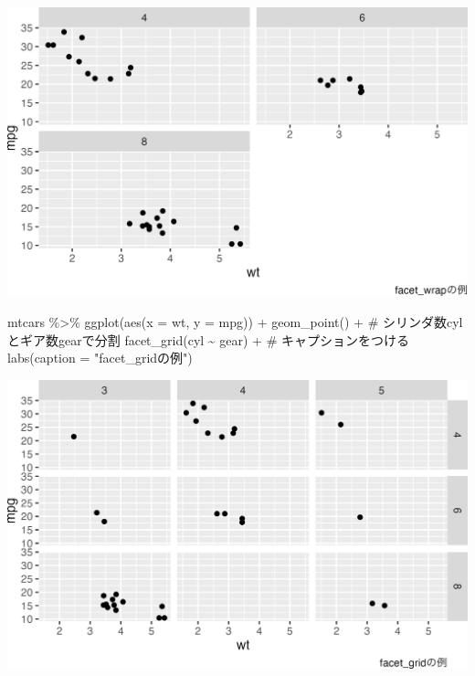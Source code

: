 \documentclass[
  a4paper,
]{ltjsbook}
\newenvironment{Shaded}{\begin{snugshade}}{\end{snugshade}}
\newcommand{\AttributeTok}[1]{\textcolor[rgb]{0.40,0.45,0.13}{#1}}
\newcommand{\CommentTok}[1]{\textcolor[rgb]{0.37,0.37,0.37}{#1}}
\newcommand{\FunctionTok}[1]{\textcolor[rgb]{0.28,0.35,0.67}{#1}}
\newcommand{\NormalTok}[1]{\textcolor[rgb]{0.00,0.23,0.31}{#1}}
\newcommand{\SpecialCharTok}[1]{\textcolor[rgb]{0.37,0.37,0.37}{#1}}
\newcommand{\StringTok}[1]{\textcolor[rgb]{0.13,0.47,0.30}{#1}}
\begin{document}
\includegraphics{chapter04_files/figure-pdf/exampleFacetWrap-1.png}

\begin{Shaded}
\begin{Highlighting}[]
\NormalTok{mtcars }\SpecialCharTok{\%\textgreater{}\%}
  \FunctionTok{ggplot}\NormalTok{(}\FunctionTok{aes}\NormalTok{(}\AttributeTok{x =}\NormalTok{ wt, }\AttributeTok{y =}\NormalTok{ mpg)) }\SpecialCharTok{+}
  \FunctionTok{geom\_point}\NormalTok{() }\SpecialCharTok{+}
  \CommentTok{\# シリンダ数cylとギア数gearで分割}
  \FunctionTok{facet\_grid}\NormalTok{(cyl }\SpecialCharTok{\textasciitilde{}}\NormalTok{ gear) }\SpecialCharTok{+}
  \CommentTok{\# キャプションをつける}
  \FunctionTok{labs}\NormalTok{(}\AttributeTok{caption =} \StringTok{"facet\_gridの例"}\NormalTok{)}
\end{Highlighting}
\end{Shaded}

\includegraphics{chapter04_files/figure-pdf/exampleFacetGrid-1.png}
\end{document}
